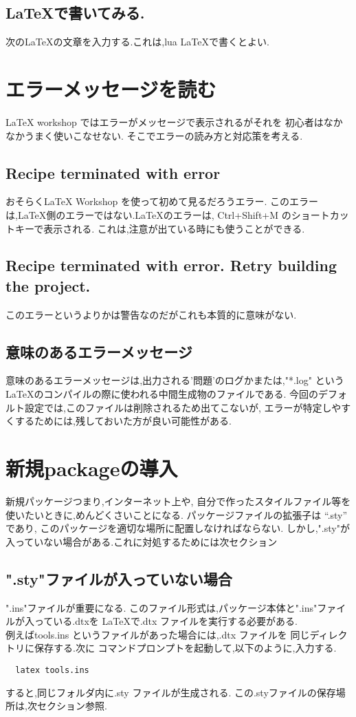 \documentclass{ltjsarticle}
\begin{document}
\subsection{\LaTeX で書いてみる.}
次の\LaTeX の文章を入力する.これは,lua \LaTeX で書くとよい.


\section{エラーメッセージを読む}
LaTeX workshop ではエラーがメッセージで表示されるがそれを
初心者はなかなかうまく使いこなせない.
そこでエラーの読み方と対応策を考える.
\subsection{Recipe terminated with error}
おそらくLaTeX Workshop を使って初めて見るだろうエラー.
このエラーは,LaTeX側のエラーではない.LaTeXのエラーは,
Ctrl+Shift+M のショートカットキーで表示される.
これは,注意が出ている時にも使うことができる.
\subsection{Recipe terminated with error. Retry building the project.}
このエラーというよりかは警告なのだがこれも本質的に意味がない.
\subsection{意味のあるエラーメッセージ}
意味のあるエラーメッセージは,出力される'問題'のログかまたは,"*.log"
というLaTeXのコンパイルの際に使われる中間生成物のファイルである.
今回のデフォルト設定では,このファイルは削除されるため出てこないが,
エラーが特定しやすくするためには,残しておいた方が良い可能性がある.

\section{新規packageの導入}
新規パッケージつまり,インターネット上や,
自分で作ったスタイルファイル等を使いたいときに,めんどくさいことになる.
パッケージファイルの拡張子は “.sty” であり,
このパッケージを適切な場所に配置しなければならない.
しかし,".sty"が入っていない場合がある.これに対処するためには次セクション
\subsection{".sty"ファイルが入っていない場合}
".ins"ファイルが重要になる.
このファイル形式は,パッケージ本体と".ins"ファイルが入っている.dtxを
LaTeXで.dtx ファイルを実行する必要がある.\\
例えばtools.ins というファイルがあった場合には,.dtx ファイルを
同じディレクトリに保存する.次に
コマンドプロンプトを起動して,以下のように,入力する.
\begin{verbatim}
  latex tools.ins
\end{verbatim}
すると,同じフォルダ内に.sty ファイルが生成される.
この.styファイルの保存場所は,次セクション参照.
\end{document}
